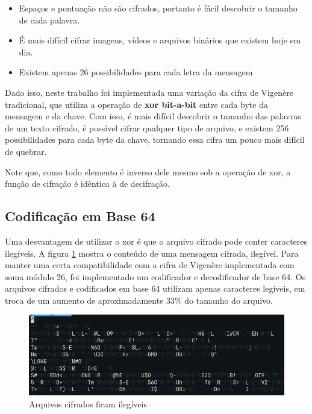 \documentclass[conference]{IEEEtran}
\begin{document}
\begin{itemize}
    \item Espaços e pontuação não são cifrados, portanto é fácil descobrir o tamanho de cada
        palavra.
    \item É mais difícil cifrar imagens, vídeos e arquivos binários que existem
        hoje em dia.
    \item Existem apenas 26 possibilidades para cada letra da mensagem
\end{itemize}

Dado isso, neste trabalho foi implementada uma variação da cifra de Vigenère
tradicional, que utiliza a operação de \textbf{xor bit-a-bit} entre cada byte da mensagem
e da chave. Com isso, é mais difícil descobrir o tamanho das palavras de um
texto cifrado, é possível cifrar qualquer tipo de arquivo, e existem 256
possibilidades para cada byte da chave, tornando essa cifra um pouco mais
difícil de quebrar.

Note que, como todo elemento é inverso dele mesmo sob a operação de xor, a
função de cifração é idêntica à de decifração.

\subsection{Codificação em Base 64}
\label{sec:base64}
Uma desvantagem de utilizar o xor é que o arquivo cifrado pode conter caracteres
ilegíveis. A figura \ref{fig:illegible} mostra o conteúdo de uma mensagem
cifrada, ilegível. Para manter uma certa compatibilidade com a cifra de Vigenère
implementada com soma módulo 26, foi implementado um codificador e decodificador
de base 64. Os arquivos cifrados e codificados em base 64 utilizam apenas
caracteres legíveis, em troca de um aumento de aproximadamente 33\% do tamanho
do arquivo.

\begin{figure}[htbp]
\centerline{\includegraphics[width=\linewidth]{img/ss2.jpg}}
\caption{Arquivos cifrados ficam ilegíveis}
\label{fig:illegible}
\end{figure}
\end{document}
